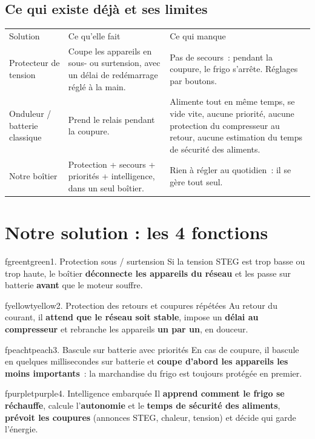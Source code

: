 \documentclass[10pt,a4paper]{article}
\begin{document}
\subsection{Ce qui existe déjà et ses limites}
\begin{tabularx}{\linewidth}{Q{3.4cm}LL}
 Solution & \mdseries Ce qu'elle fait & \mdseries Ce qui manque \\
Protecteur de tension & Coupe les appareils en sous- ou surtension, avec un délai de redémarrage réglé à la main. & Pas de secours~: pendant la coupure, le frigo s'arrête. Réglages par boutons. \\
Onduleur / batterie classique & Prend le relais pendant la coupure. & Alimente tout en même temps, se vide vite, aucune priorité, aucune protection du compresseur au retour, aucune estimation du temps de sécurité des aliments. \\
 \color{tgreen}Notre boîtier & \color{tgreen}Protection + secours + priorités + intelligence, dans un seul boîtier. & \color{tgreen}Rien à régler au quotidien~: il se gère tout seul. \\
\end{tabularx}

\section{Notre solution : les 4 fonctions}

\begin{tcbraster}[raster columns=2, raster equal height=rows, raster column skip=4mm, raster row skip=5mm]
\begin{tbox}{fgreen}{tgreen}{1. Protection sous / surtension}
Si la tension STEG est trop basse ou trop haute, le boîtier \textbf{déconnecte les appareils du réseau} et les passe sur batterie \textbf{avant} que le moteur souffre.
\end{tbox}
\begin{tbox}{fyellow}{tyellow}{2. Protection des retours et coupures répétées}
Au retour du courant, il \textbf{attend que le réseau soit stable}, impose un \textbf{délai au compresseur} et rebranche les appareils \textbf{un par un}, en douceur.
\end{tbox}
\begin{tbox}{fpeach}{tpeach}{3. Bascule sur batterie avec priorités}
En cas de coupure, il bascule en quelques millisecondes sur batterie et \textbf{coupe d'abord les appareils les moins importants}~: la marchandise du frigo est toujours protégée en premier.
\end{tbox}
\begin{tbox}{fpurple}{tpurple}{4. Intelligence embarquée}
Il \textbf{apprend comment le frigo se réchauffe}, calcule l'\textbf{autonomie} et le \textbf{temps de sécurité des aliments}, \textbf{prévoit les coupures} (annonces STEG, chaleur, tension) et décide qui garde l'énergie.
\end{tbox}
\end{tcbraster}
\end{document}
